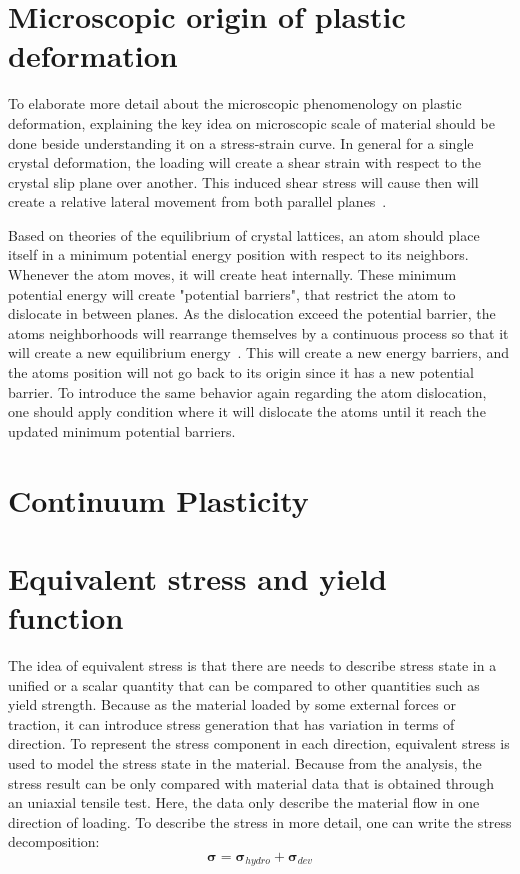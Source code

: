 \documentclass[12pt]{article}
\begin{document}
\section{Microscopic origin of plastic deformation}
\hspace{2em}
To elaborate more detail about the microscopic phenomenology on plastic deformation, explaining the key idea on microscopic 
scale of material should be done beside understanding it on a stress-strain curve. In general for a single crystal deformation, 
the loading will create a shear strain with respect to the crystal slip plane over another. This induced shear stress will cause
then will create a relative lateral movement from both parallel planes~\cite{taylor1934plastic}. 

\hspace{2em}
Based on theories of the equilibrium of crystal lattices, an atom should place itself in a minimum potential energy position
with respect to its neighbors. Whenever the atom moves, it will create heat internally. These minimum potential energy
will create "potential barriers", that restrict the atom to dislocate in between planes. As the dislocation exceed the
potential barrier, the atoms neighborhoods will rearrange themselves by a continuous process so that it will create a 
new equilibrium energy~\cite{taylor1934plastic}. This will create a new energy barriers, and the atoms position will not go back to
its origin since it has a new potential barrier. To introduce the same behavior again regarding the atom dislocation, 
one should apply condition where it will dislocate the atoms until it reach the updated minimum potential barriers.

\section*{Continuum Plasticity}
\section{Equivalent stress and yield function}
\hspace{2em}
The idea of equivalent stress is that there are needs to describe stress state in a unified or a scalar quantity
that can be compared to other quantities such as yield strength. Because as the material loaded by some external forces or traction,
it can introduce stress generation that has variation in terms of direction. To represent the stress component in each
direction, equivalent stress is used to model the stress state in the material. Because from the analysis, the stress result
can be only compared with material data that is obtained through an uniaxial tensile test. Here, the data only describe
the material flow in one direction of loading. To describe the stress in more detail, one can write the stress decomposition:
\begin{equation}
\boldsymbol{\sigma} = \boldsymbol{\sigma}_{hydro} + \boldsymbol{\sigma}_{dev}
\end{equation}
\end{document}
